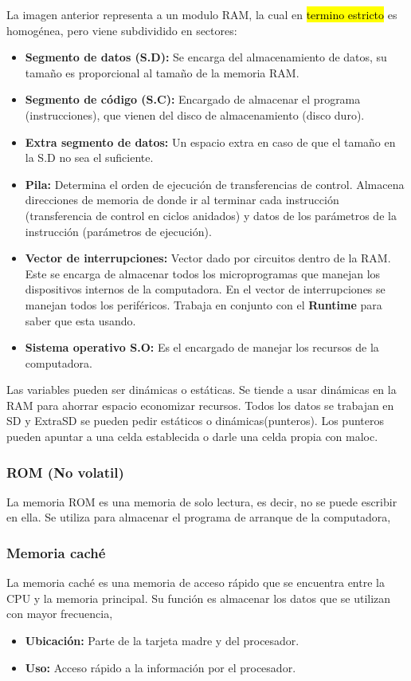 \documentclass{templateNote}
\begin{document}
\noindent La imagen anterior representa a un modulo RAM, la cual en \hl{termino estricto} es homogénea, pero viene subdividido en sectores:
\begin{itemize}
    \item \textbf{Segmento de datos (S.D):} Se encarga del almacenamiento de datos, su tamaño es proporcional al tamaño de la memoria RAM.
    \item \textbf{Segmento de código (S.C):} Encargado de almacenar el programa (instrucciones), que vienen del disco de almacenamiento (disco duro).
    \item \textbf{Extra segmento de datos:} Un espacio extra en caso de que el tamaño en la S.D no sea el suficiente.
    \item \textbf{Pila:} Determina el orden de ejecución de transferencias de control. Almacena direcciones de memoria de donde ir al terminar cada instrucción 
    (transferencia de control en ciclos anidados) y datos de los parámetros de la instrucción (parámetros de ejecución).
    \item \textbf{Vector de interrupciones:} Vector dado por circuitos dentro de la RAM. Este se encarga de almacenar todos los microprogramas que manejan los 
    dispositivos internos de la computadora. En el vector de interrupciones se manejan todos los periféricos. Trabaja en conjunto con el \textbf{Runtime} 
    para saber que esta usando.
    \item \textbf{Sistema operativo S.O:} Es el encargado de manejar los recursos de la computadora.
\end{itemize}
\noindent Las variables pueden ser dinámicas o estáticas. Se tiende a usar dinámicas en la RAM para ahorrar espacio economizar recursos. Todos los datos se trabajan en 
SD y ExtraSD se pueden pedir estáticos o dinámicas(punteros). Los punteros pueden apuntar a una celda establecida o darle una celda propia con maloc.

\subsubsection{ROM (No volatil)}
\noindent La memoria ROM es una memoria de solo lectura, es decir, no se puede escribir en ella. Se utiliza para almacenar el programa de arranque de la computadora,

\subsubsection{Memoria caché}
\noindent La memoria caché es una memoria de acceso rápido que se encuentra entre la CPU y la memoria principal. Su función es almacenar los datos que se utilizan con mayor frecuencia,
\begin{itemize}
    \item \textbf{Ubicación:} Parte de la tarjeta madre y del procesador.
    \item \textbf{Uso:} Acceso rápido a la información por el procesador.
\end{itemize}
\end{document}
